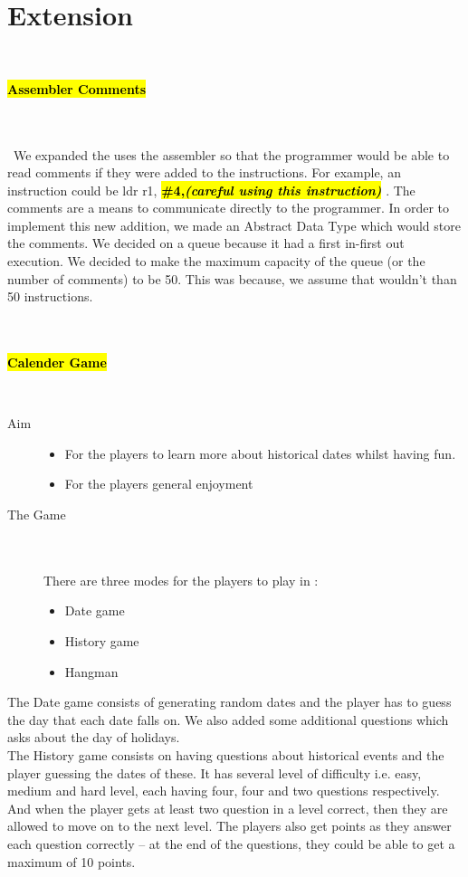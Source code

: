 \documentclass[9pt]{article}
\begin{document}
\section{Extension} \\
    \centerline{\hl{\textbf{Assembler Comments}}}  \\\\\
    We expanded the uses  the assembler so that the programmer would be able to read comments if they were added to the instructions. For example, an instruction could be ldr r1,
    \hl{\textbf{\#4,\emph{(careful using this instruction)}}} . The comments are a means to communicate directly to the programmer. In order to implement this new addition, we made an Abstract Data Type which would store the comments. We decided on a queue because it had a first in-first out execution. We decided to make the maximum capacity of the queue (or the number of comments) to be 50. This was because, we assume that wouldn’t than 50 instructions. \\\\\\
    \centerline{\hl{\textbf{Calender Game}}}  \\
    \begin{description}
    \item[Aim] \hfill 
        \begin{itemize}
            \item For the players to learn more about historical dates whilst having fun.
            \item For the players general enjoyment
        \end{itemize}
    \item[The Game] \hfill \\\\
    There are three modes for the players to play in :
        \begin{itemize}
            \item Date game 
            \item History game
            \item Hangman
        \end{itemize}
    \end{description}     
    The Date game consists of generating random dates and the player has to guess the day that each date falls on. We also added some additional questions which asks about the day of holidays.\\
    The History game consists on having questions about historical events and the player guessing the dates of these. It has several level of difficulty i.e. easy, medium and hard level, each having four, four and two questions respectively. And when the player gets at least two question in a level correct, then they are allowed to move on to the next level. The players also get points as they answer each question correctly – at the end of the questions, they could be able to get a maximum of 10 points. \\
    
\end{document}
